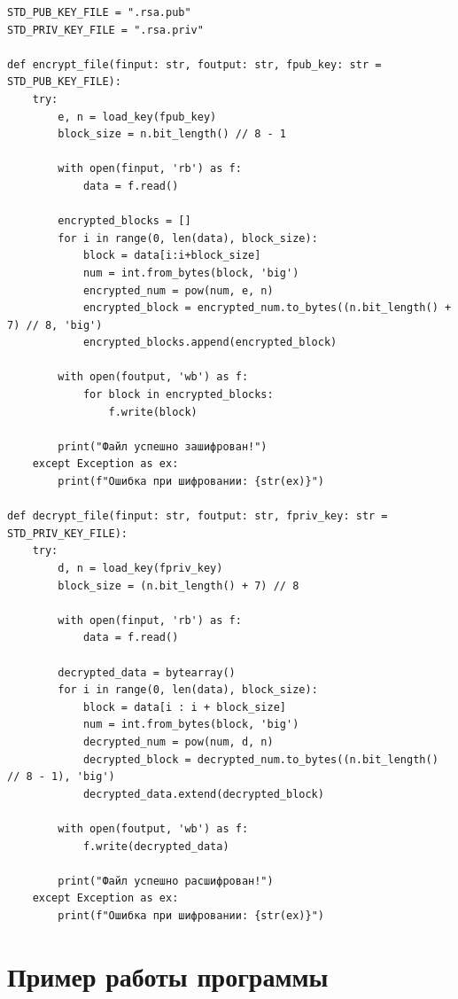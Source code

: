 \begin{center}
\captionsetup{justification=raggedright,singlelinecheck=off}
\begin{lstlisting}[label=lst:edcrypt,caption=Шифрование/расшифровка алгоритмом RSA]
STD_PUB_KEY_FILE = ".rsa.pub"
STD_PRIV_KEY_FILE = ".rsa.priv"

def encrypt_file(finput: str, foutput: str, fpub_key: str = STD_PUB_KEY_FILE):
    try:
        e, n = load_key(fpub_key)
        block_size = n.bit_length() // 8 - 1
        
        with open(finput, 'rb') as f:
            data = f.read()
        
        encrypted_blocks = []
        for i in range(0, len(data), block_size):
            block = data[i:i+block_size]
            num = int.from_bytes(block, 'big')
            encrypted_num = pow(num, e, n)
            encrypted_block = encrypted_num.to_bytes((n.bit_length() + 7) // 8, 'big')
            encrypted_blocks.append(encrypted_block)
        
        with open(foutput, 'wb') as f:
            for block in encrypted_blocks:
                f.write(block)
        
        print("Файл успешно зашифрован!")
    except Exception as ex:
        print(f"Ошибка при шифровании: {str(ex)}")

def decrypt_file(finput: str, foutput: str, fpriv_key: str = STD_PRIV_KEY_FILE):
    try:
        d, n = load_key(fpriv_key)
        block_size = (n.bit_length() + 7) // 8
        
        with open(finput, 'rb') as f:
            data = f.read()
        
        decrypted_data = bytearray()
        for i in range(0, len(data), block_size):
            block = data[i : i + block_size]
            num = int.from_bytes(block, 'big')
            decrypted_num = pow(num, d, n)
            decrypted_block = decrypted_num.to_bytes((n.bit_length() // 8 - 1), 'big')
            decrypted_data.extend(decrypted_block)
        
        with open(foutput, 'wb') as f:
            f.write(decrypted_data)
        
        print("Файл успешно расшифрован!")
    except Exception as ex:
        print(f"Ошибка при шифровании: {str(ex)}")
\end{lstlisting}
\end{center}

\clearpage

\section{Пример работы программы}

